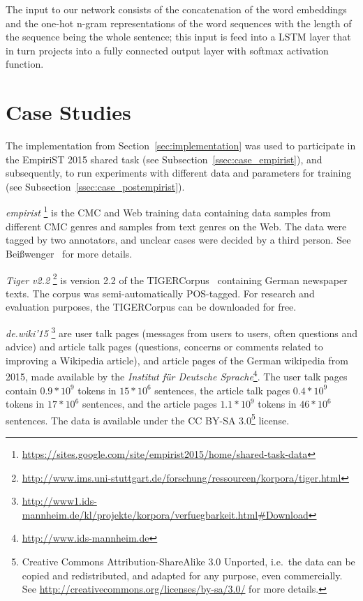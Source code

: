 \documentclass[11pt]{article}
\begin{document}
The input to our network consists of the concatenation of the word embeddings
and the one-hot n-gram representations of the word sequences with the length of
the sequence being the whole sentence; this input is feed into a LSTM layer
that in turn projects into a fully connected output layer with softmax
activation function. 

\section{Case Studies}
\label{sec:casestudies}

The implementation from Section~\ref{sec:implementation} was used to
participate in the EmpiriST 2015 shared task (see
Subsection~\ref{ssec:case_empirist}), and subsequently, to run experiments with
different data and parameters for training (see
Subsection~\ref{ssec:case_postempirist}).

\emph{empirist}%
\footnote{\url{https://sites.google.com/site/empirist2015/home/shared-task-data}}
is the CMC and Web training data containing data samples from different CMC
genres and samples from text genres on the Web.
The data were tagged by two annotators, and unclear cases were decided by a
third person. See Bei{\ss}wenger~ for more details.

\emph{Tiger v2.2}%
\footnote{\url{http://www.ims.uni-stuttgart.de/forschung/ressourcen/korpora/tiger.html}}
is version 2.2 of the TIGERCorpus~\cite{Brants2004} containing German newspaper
texts. 
The corpus was semi-automatically POS-tagged. For research and evaluation
purposes, the TIGERCorpus can be downloaded for free.

\emph{de.wiki'15}%
\footnote{\url{http://www1.ids-mannheim.de/kl/projekte/korpora/verfuegbarkeit.html#Download}}
are user talk pages (messages from users to users, often questions and advice)
and article talk pages (questions, concerns or comments related to improving a
Wikipedia article), and article pages of the German wikipedia from 2015, made
available by the \emph{Institut f\"{u}r Deutsche
Sprache}\footnote{\url{http://www.ids-mannheim.de}}.
The user talk pages contain
$0.9*10^9$ tokens in
$15*10^6$ sentences, the article talk pages
$0.4*10^9$ tokens in
$17*10^6$ sentences, and the article pages
$1.1*10^9$
tokens in
$46*10^6$ sentences.
The data is available under the CC BY-SA 3.0\footnote{Creative Commons
Attribution-ShareAlike 3.0 Unported, i.e.~the data can be copied and
redistributed, and adapted for any purpose, even commercially. See
\url{http://creativecommons.org/licenses/by-sa/3.0/} for more details.}
license.
\end{document}
